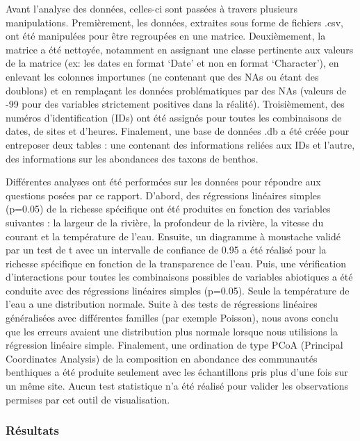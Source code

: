 \documentclass[9pt,twocolumn,twoside,]{pnas-new}
\begin{document}
Avant l'analyse des données, celles-ci sont passées à travers plusieurs
manipulations. Premièrement, les données, extraites sous forme de
fichiers .csv, ont été manipulées pour être regroupées en une matrice.
Deuxièmement, la matrice a été nettoyée, notamment en assignant une
classe pertinente aux valeurs de la matrice (ex: les dates en format
`Date' et non en format `Character'), en enlevant les colonnes
importunes (ne contenant que des NAs ou étant des doublons) et en
remplaçant les données problématiques par des NAs (valeurs de -99 pour
des variables strictement positives dans la réalité). Troisièmement, des
numéros d'identification (IDs) ont été assignés pour toutes les
combinaisons de dates, de sites et d'heures. Finalement, une base de
données .db a été créée pour entreposer deux tables : une contenant des
informations reliées aux IDs et l'autre, des informations sur les
abondances des taxons de benthos.

Différentes analyses ont été performées sur les données pour répondre
aux questions posées par ce rapport. D'abord, des régressions linéaires
simples (p=0.05) de la richesse spécifique ont été produites en fonction
des variables suivantes : la largeur de la rivière, la profondeur de la
rivière, la vitesse du courant et la température de l'eau. Ensuite, un
diagramme à moustache validé par un test de t avec un intervalle de
confiance de 0.95 a été réalisé pour la richesse spécifique en fonction
de la transparence de l'eau. Puis, une vérification d'interactions pour
toutes les combinaisons possibles de variables abiotiques a été conduite
avec des régressions linéaires simples (p=0.05). Seule la température de
l'eau a une distribution normale. Suite à des tests de régressions
linéaires généralisées avec différentes familles (par exemple Poisson),
nous avons conclu que les erreurs avaient une distribution plus normale
lorsque nous utilisions la régression linéaire simple. Finalement, une
ordination de type PCoA (Principal Coordinates Analysis) de la
composition en abondance des communautés benthiques a été produite
seulement avec les échantillons pris plus d'une fois sur un même site.
Aucun test statistique n'a été réalisé pour valider les observations
permises par cet outil de visualisation.

\hypertarget{ruxe9sultats}{%
\subsubsection*{Résultats}\label{ruxe9sultats}}
\end{document}
